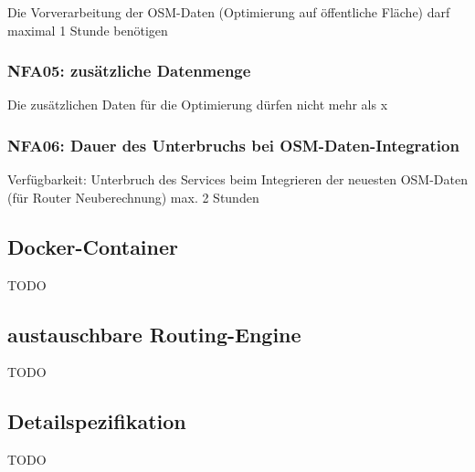 Die Vorverarbeitung der \ac{OSM}-Daten (Optimierung auf öffentliche Fläche) darf maximal 1 Stunde benötigen

\subsubsection{NFA05: zusätzliche Datenmenge}
\label{NFA:NFA05}

Die zusätzlichen Daten für die Optimierung dürfen nicht mehr als x%

\subsubsection{NFA06: Dauer des Unterbruchs bei OSM-Daten-Integration}
\label{NFA:NFA06}

Verfügbarkeit: Unterbruch des Services beim Integrieren der neuesten \ac{OSM}-Daten (für Router Neuberechnung) max. 2 Stunden

\subsection{Docker-Container}
\label{nfa:Docker-Container}

TODO

\subsection{austauschbare Routing-Engine}
\label{nfa:austauschbare Routing-Engine}

TODO

\subsection{Detailspezifikation}
\label{sub:Detailspezifikation}

TODO